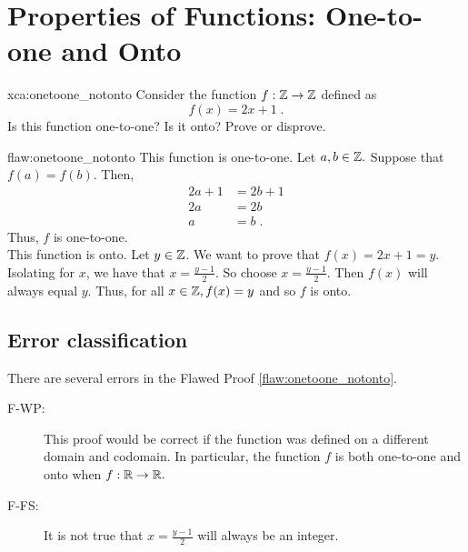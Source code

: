\section{Properties of Functions: One-to-one and Onto}

\begin{xca}{xca:onetoone_notonto}
Consider the function $f: \mathbb Z \rightarrow \mathbb Z$ defined as
$$f(x) = 2x+1\;.$$
Is this function one-to-one? Is it onto? Prove or disprove. 
\end{xca}

\begin{flaw}{flaw:onetoone_notonto} %
This function is one-to-one. Let $a,b \in \mathbb Z.$ Suppose that $f(a)=f(b).$ Then,
\begin{align*}
2a + 1 &= 2b + 1 \\
2a &= 2b \\
a &= b\;.
\end{align*}
Thus, $f$ is one-to-one. \\

This function is onto. Let $y \in \mathbb Z$. We want to prove that $f(x)=2x+1=y$. Isolating for $x$, we have that $x= \frac{y - 1}{2}$. So choose $x=\frac{y - 1}{2}$. Then $f(x)$ will always equal $y$. Thus, for all $x \in \mathbb Z, f(x)= y$ and so $f$ is onto.
\end{flaw}

\clearpage
\subsection{Error classification}


There are several errors
 in the Flawed Proof \ref{flaw:onetoone_notonto}. %

 
 \begin{description}
 	\item[F-WP:] This proof would be correct if the function was defined on a different domain and codomain. In particular, the function $f$ is both one-to-one and onto when $f: \mathbb R \rightarrow \mathbb R.$
 	\item[F-FS:] It is not true that $x=\frac{y - 1}{2}$ will always be an integer. 
 \end{description}

